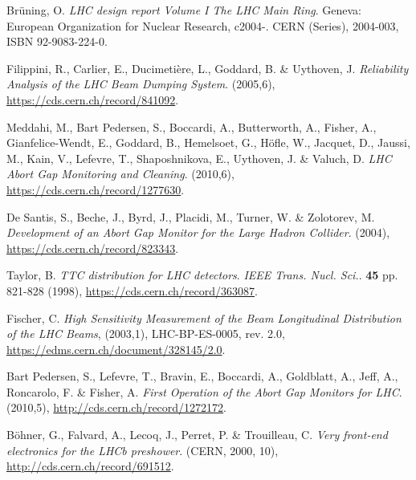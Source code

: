 %
{\printbibliography}{

    \begin{thebibliography}{99}
	
         Br\"uning, O. \emph{LHC design report Volume I The LHC
            Main Ring}. Geneva: European Organization for Nuclear Research, c2004-. CERN
            (Series), 2004-003, ISBN 92-9083-224-0.

         Filippini, R., Carlier, E., Ducimetière, L., Goddard,
            B. \& Uythoven, J. \emph{Reliability Analysis of the LHC Beam Dumping System}.
            (2005,6), \url{https://cds.cern.ch/record/841092}.

        Meddahi, M., Bart Pedersen, S., Boccardi, A.,
            Butterworth, A., Fisher, A., Gianfelice-Wendt, E., Goddard, B., Hemelsoet,
            G., Höfle, W., Jacquet, D., Jaussi, M., Kain, V., Lefevre, T., Shaposhnikova,
            E., Uythoven, J. \& Valuch, D. \emph{LHC Abort Gap Monitoring and Cleaning}.
            (2010,6), \url{https://cds.cern.ch/record/1277630}.

        De Santis, S., Beche, J., Byrd, J., Placidi, M.,
            Turner, W. \& Zolotorev, M. \emph{Development of an Abort Gap Monitor for the
            Large Hadron Collider}.  (2004), \url{https://cds.cern.ch/record/823343}.

         Taylor, B. \emph{TTC distribution for LHC detectors}.
            {\em IEEE Trans. Nucl. Sci.}. \textbf{45} pp. 821-828 (1998),
            \url{https://cds.cern.ch/record/363087}.

         Fischer, C.  \emph{High Sensitivity
            Measurement of the Beam Longitudinal Distribution of the LHC Beams}, 
            (2003,1), LHC-BP-ES-0005, rev. 2.0,
            \url{https://edms.cern.ch/document/328145/2.0}.

        Bart Pedersen, S., Lefevre, T., Bravin, E., Boccardi, A.,
          Goldblatt, A., Jeff, A., Roncarolo, F. \& Fisher, A. \emph{First Operation of
          the Abort Gap Monitors for LHC}.  (2010,5), \url{http://cds.cern.ch/record/1272172}.

         Böhner, G., Falvard, A., Lecoq, J., Perret, P. \& Trouilleau,
            C. \emph{Very front-end electronics for the LHCb preshower}. (CERN, 2000, 10), \url{http://cds.cern.ch/record/691512}.


\end{thebibliography}}
